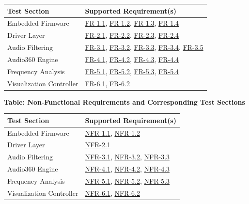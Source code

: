 \documentclass[12pt, titlepage]{article}
\begin{document}
\noindent
\begin{tabular}{|l|l|}
\hline
\textbf{Test Section} & \textbf{Supported Requirement(s)} \\ \hline
Embedded Firmware & \hyperref[SRS-FR1_1]{FR-1.1}, \hyperref[SRS-FR1_2]{FR-1.2},
\hyperref[SRS-FR1_3]{FR-1.3}, \hyperref[SRS-FR1_4]{FR-1.4} \\ \hline
Driver Layer & \hyperref[SRS-FR2_1]{FR-2.1}, \hyperref[SRS-FR2_2]{FR-2.2},
\hyperref[SRS-FR2_3]{FR-2.3}, \hyperref[SRS-FR2_4]{FR-2.4} \\ \hline
Audio Filtering & \hyperref[SRS-FR3_1]{FR-3.1}, \hyperref[SRS-FR3_2]{FR-3.2},
\hyperref[SRS-FR3_3]{FR-3.3}, \hyperref[SRS-FR3_4]{FR-3.4},
\hyperref[SRS-FR3_5]{FR-3.5} \\ \hline
Audio360 Engine & \hyperref[SRS-FR4_1]{FR-4.1}, \hyperref[SRS-FR4_2]{FR-4.2},
\hyperref[SRS-FR4_3]{FR-4.3}, \hyperref[SRS-FR4_4]{FR-4.4} \\ \hline
Frequency Analysis & \hyperref[SRS-FR5_1]{FR-5.1},
\hyperref[SRS-FR5_2]{FR-5.2}, \hyperref[SRS-FR5_3]{FR-5.3},
\hyperref[SRS-FR5_4]{FR-5.4} \\ \hline
Visualization Controller & \hyperref[SRS-FR6_1]{FR-6.1},
\hyperref[SRS-FR6_2]{FR-6.2} \\ \hline
\end{tabular}

\vspace{0.5cm}

\noindent
\textbf{Table: Non-Functional Requirements and Corresponding Test Sections}

\noindent
\begin{tabular}{|l|l|}
\hline
\textbf{Test Section} & \textbf{Supported Requirement(s)} \\ \hline
Embedded Firmware & \hyperref[SRS-NFR1_1]{NFR-1.1},
\hyperref[SRS-NFR1_2]{NFR-1.2} \\ \hline
Driver Layer & \hyperref[SRS-NFR2_1]{NFR-2.1} \\ \hline
Audio Filtering & \hyperref[SRS-NFR3_1]{NFR-3.1},
\hyperref[SRS-NFR3_2]{NFR-3.2}, \hyperref[SRS-NFR3_3]{NFR-3.3} \\ \hline
Audio360 Engine & \hyperref[SRS-NFR4_1]{NFR-4.1},
\hyperref[SRS-NFR4_2]{NFR-4.2}, \hyperref[SRS-NFR4_3]{NFR-4.3} \\ \hline
Frequency Analysis & \hyperref[SRS-NFR5_1]{NFR-5.1},
\hyperref[SRS-NFR5_2]{NFR-5.2}, \hyperref[SRS-NFR5_3]{NFR-5.3} \\ \hline
Visualization Controller & \hyperref[SRS-NFR6_1]{NFR-6.1},
\hyperref[SRS-NFR6_2]{NFR-6.2} \\ \hline
\end{tabular}
\end{document}
